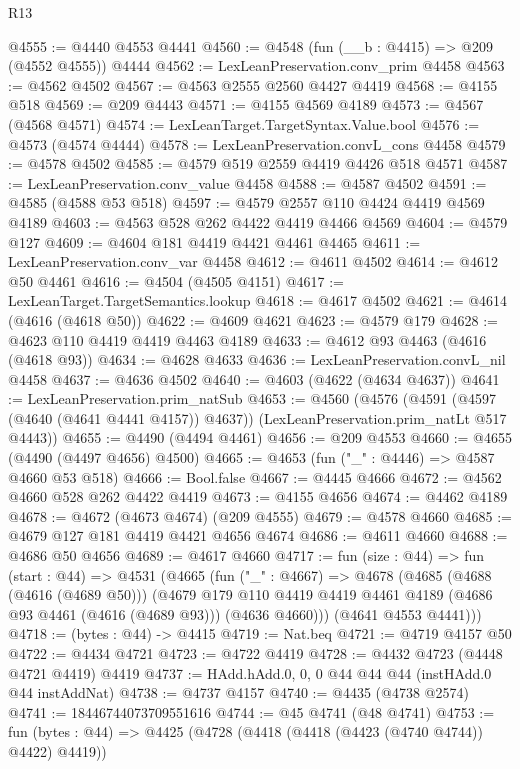 \begin{lexlean}{R13}
\begin{coremodule}
{{{{{{{{{{{{{{{{{{{{{{{{{{{{{{{{{{{{{{{{{{{{{{{{{{{{{{{{{{{{{{{{{{{{{{{{{{{{{{{{{{{{{{{{{{{{{{{{{{{{{{{{{{@4555 := @4440 @4553 @4441
@4560 := @4548 (fun (__b : @4415) => @209 (@4552 @4555)) @4444
@4562 := LexLeanPreservation.conv_prim @4458
@4563 := @4562 @4502
@4567 := @4563 @2555 @2560 @4427 @4419
@4568 := @4155 @518
@4569 := @209 @4443
@4571 := @4155 @4569 @4189
@4573 := @4567 (@4568 @4571)
@4574 := LexLeanTarget.TargetSyntax.Value.bool
@4576 := @4573 (@4574 @4444)
@4578 := LexLeanPreservation.convL_cons @4458
@4579 := @4578 @4502
@4585 := @4579 @519 @2559 @4419 @4426 @518 @4571
@4587 := LexLeanPreservation.conv_value @4458
@4588 := @4587 @4502
@4591 := @4585 (@4588 @53 @518)
@4597 := @4579 @2557 @110 @4424 @4419 @4569 @4189
@4603 := @4563 @528 @262 @4422 @4419 @4466 @4569
@4604 := @4579 @127
@4609 := @4604 @181 @4419 @4421 @4461 @4465
@4611 := LexLeanPreservation.conv_var @4458
@4612 := @4611 @4502
@4614 := @4612 @50 @4461
@4616 := @4504 (@4505 @4151)
@4617 := LexLeanTarget.TargetSemantics.lookup
@4618 := @4617 @4502
@4621 := @4614 (@4616 (@4618 @50))
@4622 := @4609 @4621
@4623 := @4579 @179
@4628 := @4623 @110 @4419 @4419 @4463 @4189
@4633 := @4612 @93 @4463 (@4616 (@4618 @93))
@4634 := @4628 @4633
@4636 := LexLeanPreservation.convL_nil @4458
@4637 := @4636 @4502
@4640 := @4603 (@4622 (@4634 @4637))
@4641 := LexLeanPreservation.prim_natSub
@4653 := @4560
    (@4576
      (@4591 (@4597 (@4640 (@4641 @4441 @4157)) @4637))
      (LexLeanPreservation.prim_natLt @517 @4443))
@4655 := @4490 (@4494 @4461)
@4656 := @209 @4553
@4660 := @4655 (@4490 (@4497 @4656) @4500)
@4665 := @4653 (fun ("_" : @4446) => @4587 @4660 @53 @518)
@4666 := Bool.false
@4667 := @4445 @4666
@4672 := @4562 @4660 @528 @262 @4422 @4419
@4673 := @4155 @4656
@4674 := @4462 @4189
@4678 := @4672 (@4673 @4674) (@209 @4555)
@4679 := @4578 @4660
@4685 := @4679 @127 @181 @4419 @4421 @4656 @4674
@4686 := @4611 @4660
@4688 := @4686 @50 @4656
@4689 := @4617 @4660
@4717 := fun (size : @44) =>
  fun (start : @44) =>
  @4531
    (@4665
      (fun ("_" : @4667) =>
      @4678
        (@4685
          (@4688 (@4616 (@4689 @50)))
          (@4679
            @179
            @110
            @4419
            @4419
            @4461
            @4189
            (@4686 @93 @4461 (@4616 (@4689 @93)))
            (@4636 @4660)))
        (@4641 @4553 @4441)))
@4718 := (bytes : @44) -> @4415
@4719 := Nat.beq
@4721 := @4719 @4157 @50
@4722 := @4434 @4721
@4723 := @4722 @4419
@4728 := @4432 @4723 (@4448 @4721 @4419) @4419
@4737 := HAdd.hAdd.{0, 0, 0} @44 @44 @44 (instHAdd.{0} @44 instAddNat)
@4738 := @4737 @4157
@4740 := @4435 (@4738 @2574)
@4741 := 18446744073709551616
@4744 := @45 @4741 (@48 @4741)
@4753 := fun (bytes : @44) => @4425 (@4728 (@4418 (@4418 (@4423 (@4740 @4744)) @4422) @4419))
}}}}}}}}}}}}}}}}}}}}}}}}}}}}}}}}}}}}}}}}}}}}}}}}}}}}}}}}}}}}}}}}}}}}}}}}}}}}}}}}}}}}}}}}}}}}}}}}}}}}}}}}}}
\end{coremodule}
\end{lexlean}

